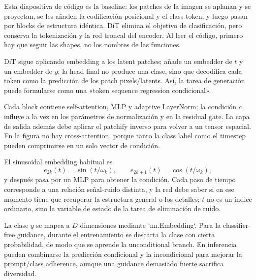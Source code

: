 
Esta diapositiva de código es la baseline: los patches de la imagen se aplanan y se proyectan, se les añaden la codificación posicional y el class token, y luego pasan por blocks de estructura idéntica. DiT elimina el objetivo de clasificación, pero conserva la tokenización y la red troncal del encoder. Al leer el código, primero hay que seguir las shapes, no los nombres de las funciones.


DiT sigue aplicando embedding a los latent patches; añade un embedder de $t$ y un embedder de $y$; la head final no produce una clase, sino que decodifica cada token como la predicción de los patch pixels/latents. Así, la tarea de generación puede formularse como una «token sequence regression condicional».


Cada block contiene self-attention, MLP y adaptive LayerNorm; la condición $c$ influye a la vez en los parámetros de normalización y en la residual gate. La capa de salida además debe aplicar el patchify inverso para volver a un tensor espacial. En la figura no hay cross-attention, porque tanto la class label como el timestep pueden comprimirse en un solo vector de condición.


El sinusoidal embedding habitual es
\[
e_{2k}(t)=\sin(t/\omega_k),\qquad
e_{2k+1}(t)=\cos(t/\omega_k),
\]
y después pasa por un MLP para obtener la condición. Cada paso de tiempo corresponde a una relación señal-ruido distinta, y la red debe saber si en ese momento tiene que recuperar la estructura general o los detalles; $t$ no es un índice ordinario, sino la variable de estado de la tarea de eliminación de ruido.


La clase $y$ se mapea a $D$ dimensiones mediante `nn.Embedding`. Para la classifier-free guidance, durante el entrenamiento se descarta la clase con cierta probabilidad, de modo que se aprende la unconditional branch. En inferencia pueden combinarse la predicción condicional y la incondicional para mejorar la prompt/class adherence, aunque una guidance demasiado fuerte sacrifica diversidad.

